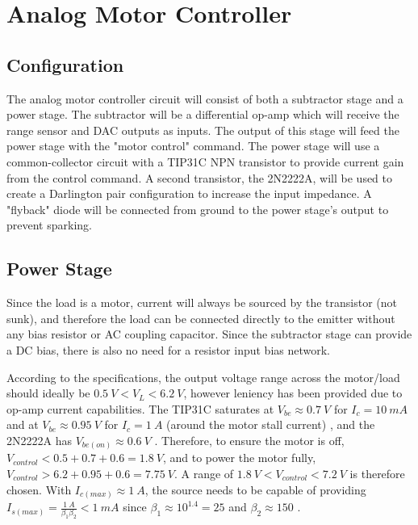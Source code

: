 \graphicspath{{content/2_design/figures/}}
\section{Analog Motor Controller}

\subsection{Configuration}

The analog motor controller circuit will consist of both a subtractor stage and a power stage. The subtractor will be a differential op-amp which will receive
the range sensor and DAC outputs as inputs. The output of this stage will feed the power stage with the "motor control" command. The power stage will use a common-collector circuit
with a TIP31C NPN transistor to provide current gain from the control command. A second transistor, the 2N2222A, will be used to create a Darlington pair configuration to increase the input impedance.
A "flyback" diode will be connected from ground to the power stage's output to prevent sparking.

\subsection{Power Stage}{\label{motorController_design_powerStage}}

Since the load is a motor, current will always be sourced by the transistor (not sunk), and therefore the load can be connected directly to the
emitter without any bias resistor or AC coupling capacitor. Since the subtractor stage can provide a DC bias, there is also no need for a resistor input bias network.

According to the specifications, the output voltage range across the motor/load should ideally be $\SI{0.5}{V} < V_L < \SI{6.2}{V}$, however leniency has been provided due to op-amp current capabilities.
The TIP31C saturates at $V_{be} \approx \SI{0.7}{V}$ for $I_c = \SI{10}{mA}$ and at $V_{be} \approx \SI{0.95}{V}$ for $I_c = \SI{1}{A}$
(around the motor stall current) \cite{datasheetTIP31C}, and the 2N2222A has $V_{be(on)} \approx \SI{0.6}{V}$ \cite{datasheet2N2222A}. Therefore, to ensure the motor is off, $V_{control} < 0.5 + 0.7 + 0.6 = \SI{1.8}{V}$,
and to power the motor fully, $V_{control} > 6.2 + 0.95 + 0.6 = \SI{7.75}{V}$. A range of $\SI{1.8}{V} < V_{control} < \SI{7.2}{V}$ is therefore chosen. With $I_{c(max)} \approx \SI{1}{A}$, the source needs to be capable of providing
$I_{s(max)} = \frac{\SI{1}{A}}{\beta_1 \beta_2} < \SI{1}{mA}$ since $\beta_1 \approx 10^{1.4} = 25$ \cite{datasheetTIP31C} and $\beta_2 \approx 150$ \cite{datasheet2N2222A}.


